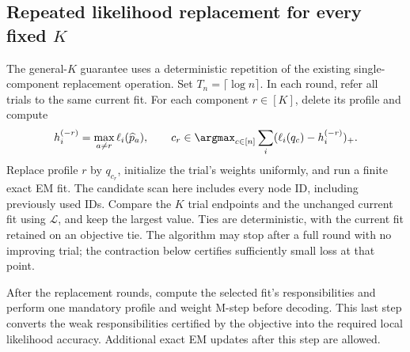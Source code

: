 \subsection{Repeated likelihood replacement for every fixed \texorpdfstring{$K$}{K}}
\label{sec:replacement}
The general-$K$ guarantee uses a deterministic repetition of the existing single-component replacement operation. Set $T_n=\lceil\log n\rceil$. In each round, refer all trials to the same current fit. For each component $r\in[K]$, delete its profile and compute
\begin{equation}
 h_i^{(-r)}=\max_{a\ne r}\ell_i(\widehat p_a),\qquad
 c_r\in\argmax_{c\in[n]}\sum_i(\ell_i(q_c)-h_i^{(-r)})_+.
 \label{eq:replacement-gain}
\end{equation}
Replace profile $r$ by $q_{c_r}$, initialize the trial's weights uniformly, and run a finite exact EM fit. The candidate scan here includes every node ID, including previously used IDs. Compare the $K$ trial endpoints and the unchanged current fit using $\mathcal L$, and keep the largest value. Ties are deterministic, with the current fit retained on an objective tie. The algorithm may stop after a full round with no improving trial; the contraction below certifies sufficiently small loss at that point.

After the replacement rounds, compute the selected fit's responsibilities and perform one mandatory profile and weight M-step before decoding. This last step converts the weak responsibilities certified by the objective into the required local likelihood accuracy. Additional exact EM updates after this step are allowed.

\begin{center}
\end{center}

